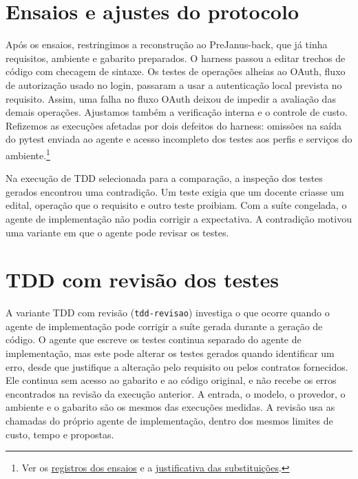 \documentclass[a4paper,12pt,twoside,english,brazilian]{book}
\begin{document}
\section{Ensaios e ajustes do protocolo}
\label{sec:prejanus-resultados-preliminares}

Após os ensaios, restringimos a reconstrução ao PreJanus-back, que já tinha
requisitos, ambiente e gabarito preparados. O harness passou a editar
trechos de código com checagem de sintaxe. Os testes de operações alheias ao
OAuth, fluxo de autorização usado no login, passaram a usar a autenticação
local prevista no requisito. Assim, uma falha no fluxo OAuth deixou de
impedir a avaliação das demais operações. Ajustamos também a verificação
interna e o controle de custo. Refizemos as execuções afetadas por dois
defeitos do harness: omissões na saída do pytest enviada ao agente e acesso
incompleto dos testes aos perfis e serviços do ambiente.\footnote{Ver os
\href{https://github.com/Educg550/tcc/tree/ee6d001c1f618419c6184644d18aa97bb33bcf9a/demos/runs/caronte}{registros dos ensaios}
e a \href{https://github.com/Educg550/tcc/blob/ee6d001c1f618419c6184644d18aa97bb33bcf9a/blog/2026-10-24-runs-refeitas-harness.md}{justificativa das substituições}.}

Na execução de TDD selecionada para a comparação, a inspeção dos testes
gerados encontrou uma contradição. Um teste exigia que um docente criasse
um edital, operação que o requisito e outro teste proibiam. Com a suíte
congelada, o agente de implementação não podia corrigir a expectativa. A
contradição motivou uma variante em que o agente pode revisar os
testes.

\section{TDD com revisão dos testes}
\label{sec:prejanus-tdd-revisao}

A variante TDD com revisão (\texttt{tdd-revisao}) investiga o que ocorre
quando o agente de implementação pode corrigir a suíte gerada durante a
geração de código. O agente que escreve os testes
continua separado do agente de implementação, mas este pode alterar os testes
gerados quando identificar um erro, desde que justifique a alteração pelo
requisito ou pelos contratos fornecidos. Ele continua sem acesso ao gabarito e
ao código original, e não recebe os erros encontrados na revisão da execução
anterior. A entrada, o modelo, o provedor, o ambiente e o gabarito são os mesmos
das execuções medidas. A revisão usa as chamadas do próprio agente de
implementação, dentro dos mesmos limites de custo, tempo e propostas.
\end{document}
